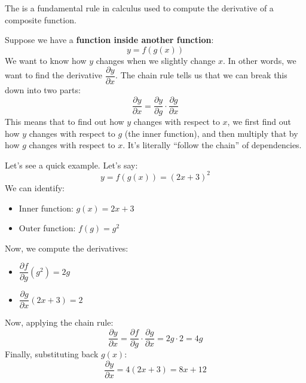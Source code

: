 \highspace
\begin{remarkbox}
    The  is a fundamental rule in calculus used to compute the derivative of a composite function.

    Suppose we have a \textbf{function inside another function}:
    \begin{equation*}
        y = f\left(g(x)\right)
    \end{equation*}
    We want to know how $y$ changes when we slightly change $x$. In other words, we want to find the derivative $\dfrac{\partial y}{\partial x}$. The chain rule tells us that we can break this down into two parts:
    \begin{equation}
        \dfrac{\partial y}{\partial x} = \dfrac{\partial y}{\partial g} \cdot \dfrac{\partial g}{\partial x}
    \end{equation}
    This means that to find out how $y$ changes with respect to $x$, we first find out how $y$ changes with respect to $g$ (the inner function), and then multiply that by how $g$ changes with respect to $x$. It's literally ``follow the chain'' of dependencies.

    Let's see a quick example. Let's say:
    \begin{equation*}
        y = f\left(g(x)\right) = \left(2x + 3\right)^{2}
    \end{equation*}
    We can identify:
    \begin{itemize}
        \item Inner function: $g(x) = 2x + 3$
        \item Outer function: $f(g) = g^{2}$
    \end{itemize}
    Now, we compute the derivatives:
    \begin{itemize}
        \item $\dfrac{\partial f}{\partial g} \left(g^{2}\right) = 2g$
        \item $\dfrac{\partial g}{\partial x} \left(2x + 3\right) = 2$
    \end{itemize}
    Now, applying the chain rule:
    \begin{equation*}
        \dfrac{\partial y}{\partial x} = \dfrac{\partial f}{\partial g} \cdot \dfrac{\partial g}{\partial x} = 2g \cdot 2 = 4g
    \end{equation*}
    Finally, substituting back $g(x)$:
    \begin{equation*}
        \dfrac{\partial y}{\partial x} = 4(2x + 3) = 8x + 12
    \end{equation*}
\end{remarkbox}

